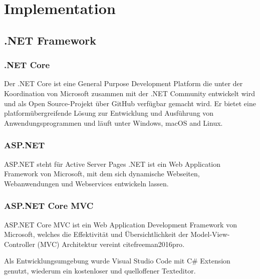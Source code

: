\chapter{Implementation}\label{ch:implementation}

\section{.NET Framework}

\subsection{.NET Core}
Der .NET Core ist eine General Purpose Development Platform die unter der Koordination von Microsoft zusammen mit der .NET Community entwickelt wird und als Open Source-Projekt über GitHub verfügbar gemacht wird. Er bietet eine platformübergreifende Lösung zur Entwicklung und Ausführung von Anwendungsprogrammen und läuft unter Windows, macOS and Linux.

\subsection{ASP.NET}

ASP.NET steht für Active Server Pages .NET ist ein Web Application Framework von Microsoft, mit dem sich dynamische Webseiten, Webanwendungen und Webservices entwickeln lassen.

\subsection{ASP.NET Core MVC}

ASP.NET Core MVC ist ein Web Application Development Framework von Microsoft, welches die Effektivität und Übersichtlichkeit der Model-View-Controller (MVC) Architektur vereint cite{freeman2016pro}.

Als Entwicklungsumgebung wurde Visual Studio Code mit C\# Extension genutzt, wiederum ein kostenloser und quelloffener Texteditor.